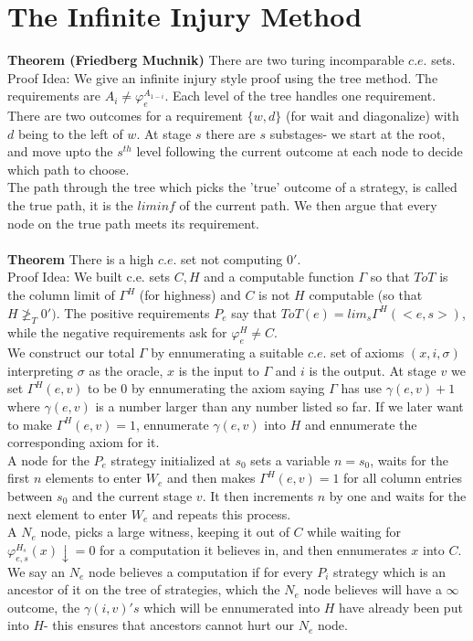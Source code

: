 \documentclass{article}
\begin{document}
	\section{The Infinite Injury Method}
	\textbf{Theorem (Friedberg Muchnik)} There are two turing incomparable $c.e.$ sets.\\
	Proof Idea: We give an infinite injury style proof using the tree method. The requirements are $A_i \neq \varphi_e^{A_{1-i}}$. Each level of the tree handles one requirement. There are two outcomes for a requirement $\{w,d\}$ (for wait and diagonalize) with $d$ being to the left of $w$. At stage $s$ there are $s$ substages- we start at the root, and move upto the $s^{th}$ level following the current outcome at each node to decide which path to choose.\\
	The path through the tree which picks the 'true' outcome of a strategy, is called the true path, it is the $lim inf $ of the current path. We then argue that every node on the true path meets its requirement.\\
	\\
	\textbf{Theorem} There is a high $c.e.$ set not computing $0'$.\\
	Proof Idea: We built c.e. sets $C, H$ and a computable function $\Gamma$ so that $ToT$ is the column limit of $\Gamma^H$ (for highness) and $C$ is not $H$ computable (so that $H \not \geq_T0')$. The positive requirements $P_e$ say that $ToT(e) = lim_s \Gamma^H(<e,s>)$, while the negative requirements ask for $\varphi_e^H \neq C$.\\
	We construct  our total $\Gamma$ by ennumerating a suitable $c.e.$ set of axioms $(x,i,\sigma)$ interpreting $\sigma$ as the oracle, $x$ is the input to $\Gamma$ and $i$ is the output. At stage $v$ we set $\Gamma^H(e,v)$ to be $0$ by ennumerating the axiom saying $\Gamma$ has use $\gamma(e,v)+1$ where $\gamma(e,v)$ is a number larger than any number listed so far. If we later want to make $\Gamma^H(e,v)=1$, ennumerate $\gamma(e,v)$ into $H$ and ennumerate the corresponding axiom for it.\\
	A node for the $P_e$ strategy initialized at $s_0$ sets a variable $n = s_0$, waits for the first $n$ elements to enter $W_e$ and then makes $\Gamma^H(e,v) = 1$ for all column entries between $s_0$ and the current stage $v$. It then increments $n$ by one and waits for the next element to enter $W_e$ and repeats this process. \\
	A $N_e$ node, picks a large witness, keeping it out of $C$ while waiting for $\varphi_{e,s}^{H_s}(x)\downarrow = 0 $ for a computation it believes in, and then ennumerates $x$ into $C$. We say an $N_e$ node believes a computation if for every $P_i$ strategy which is an ancestor of it on the tree of strategies, which the $N_e$ node believes will have a $\infty$ outcome, the $\gamma(i,v)'s$ which will be ennumerated into $H$ have already been put into $H$- this ensures that ancestors cannot hurt our $N_e$ node.\\
\end{document}
